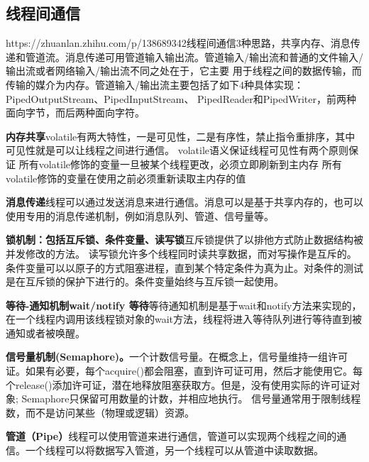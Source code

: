 \documentclass[../../../interview-questions.tex]{subfiles}
\begin{document}
\subsection{线程间通信}

https://zhuanlan.zhihu.com/p/138689342线程间通信3种思路，共享内存、消息传递和管道流。消息传递可用管道输入输出流。管道输入/输出流和普通的文件输入/输出流或者网络输入/输出流不同之处在于，它主要 用于线程之间的数据传输，而传输的媒介为内存。管道输入/输出流主要包括了如下4种具体实现：PipedOutputStream、PipedInputStream、 PipedReader和PipedWriter，前两种面向字节，而后两种面向字符。

\textbf{内存共享}volatile有两大特性，一是可见性，二是有序性，禁止指令重排序，其中可见性就是可以让线程之间进行通信。
volatile语义保证线程可见性有两个原则保证
所有volatile修饰的变量一旦被某个线程更改，必须立即刷新到主内存
所有volatile修饰的变量在使用之前必须重新读取主内存的值

\textbf{消息传递}线程可以通过发送消息来进行通信。消息可以是基于共享内存的，也可以使用专用的消息传递机制，例如消息队列、管道、信号量等。

\textbf{锁机制：包括互斥锁、条件变量、读写锁}互斥锁提供了以排他方式防止数据结构被并发修改的方法。 读写锁允许多个线程同时读共享数据，而对写操作是互斥的。 条件变量可以以原子的方式阻塞进程，直到某个特定条件为真为止。对条件的测试是在互斥锁的保护下进行的。条件变量始终与互斥锁一起使用。

\textbf{等待-通知机制wait/notify 等待}等待通知机制是基于wait和notify方法来实现的，在一个线程内调用该线程锁对象的wait方法，线程将进入等待队列进行等待直到被通知或者被唤醒。

\textbf{信号量机制(Semaphore)。}一个计数信号量。在概念上，信号量维持一组许可证。如果有必要，每个acquire()都会阻塞，直到许可证可用，然后才能使用它。每个release()添加许可证，潜在地释放阻塞获取方。但是，没有使用实际的许可证对象; Semaphore只保留可用数量的计数，并相应地执行。
信号量通常用于限制线程数，而不是访问某些（物理或逻辑）资源。

\textbf{管道（Pipe）}线程可以使用管道来进行通信，管道可以实现两个线程之间的通信。一个线程可以将数据写入管道，另一个线程可以从管道中读取数据。
\end{document}
